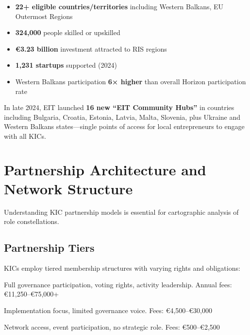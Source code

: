 \documentclass[../main.tex]{subfiles}
\begin{document}
\begin{itemize}[leftmargin=*, itemsep=0.2em]
\item \textbf{22+ eligible countries/territories} including Western Balkans, EU Outermost Regions
\item \textbf{324,000} people skilled or upskilled
\item \textbf{€3.23 billion} investment attracted to RIS regions
\item \textbf{1,231 startups} supported (2024)
\item Western Balkans participation \textbf{6× higher} than overall Horizon participation rate
\end{itemize}

In late 2024, EIT launched \textbf{16 new ``EIT Community Hubs''} in countries including Bulgaria, Croatia, Estonia, Latvia, Malta, Slovenia, plus Ukraine and Western Balkans states---single points of access for local entrepreneurs to engage with all KICs.


\section*{Partnership Architecture and Network Structure}

Understanding KIC partnership models is essential for cartographic analysis of role constellations.

\subsection*{Partnership Tiers}

KICs employ tiered membership structures with varying rights and obligations:

\begin{description}[leftmargin=0.5cm, itemsep=0.3em]
\item[Core/Strategic Partners] Full governance participation, voting rights, activity leadership. Annual fees: €11,250--€75,000+
\item[Associate/Delivery Partners] Implementation focus, limited governance voice. Fees: €4,500--€30,000
\item[Community Members/Affiliates] Network access, event participation, no strategic role. Fees: €500--€2,500
\end{description}
\end{document}
